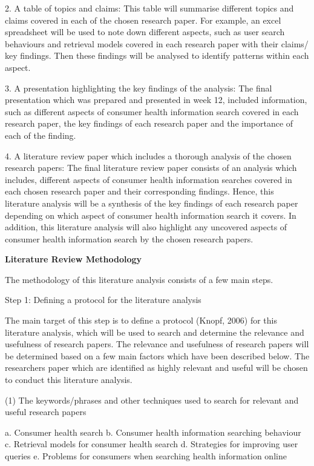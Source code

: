 \documentclass[]{article}
\begin{document}
2.	A table of topics and claims: This table will summarise different topics and claims covered in each of the chosen research paper. For example, an excel spreadsheet will be used to note down different aspects, such as user search behaviours and retrieval models covered in each research paper with their claims/ key findings. Then these findings will be analysed to identify patterns within each aspect.  
	
3.	A presentation highlighting the key findings of the analysis: The final presentation which was prepared and presented in week 12, included information, such as different aspects of consumer health information search covered in each research paper, the key findings of each research paper and the importance of each of the finding.  
	
4.	A literature review paper which includes a thorough analysis of the chosen research papers: The final literature review paper consists of an analysis which includes, different aspects of consumer health information searches covered in each chosen research paper and their corresponding findings. Hence, this literature analysis will be a synthesis of the key findings of each research paper depending on which aspect of consumer health information search it covers. In addition, this literature analysis will also highlight any uncovered aspects of consumer health information search by the chosen research papers.
	
\textbf{Literature Review Methodology}  
	
The methodology of this literature analysis consists of a few main steps.
	
Step 1: Defining a protocol for the literature analysis
	
The main target of this step is to define a protocol (Knopf, 2006) for this literature analysis, which will be used to search and determine the relevance and usefulness of research papers. The relevance and usefulness of research papers will be determined based on a few main factors which have been described below. The researchers paper which are identified as highly relevant and useful will be chosen to conduct this literature analysis. 
	
(1)	The keywords/phrases and other techniques used to search for relevant and useful research papers 
	
a. Consumer health search
b. Consumer health information searching behaviour
c. Retrieval models for consumer health search
d. Strategies for improving user queries 
e. Problems for consumers when searching health information online
	
\end{document}

